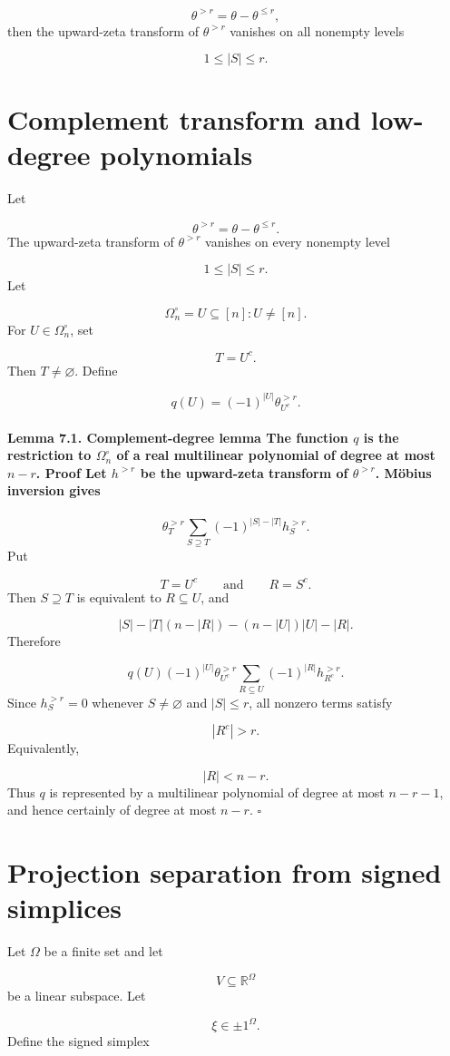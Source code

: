 \documentclass[11pt]{article}
\theoremstyle{definition}
\begin{document}
\[
\theta^{>r}=\theta-\theta^{\le r},
\]
then the upward-zeta transform of $\theta^{>r}$ vanishes on all nonempty levels

\[
1\le |S|\le r.
\]
\section{Complement transform and low-degree polynomials}
Let

\[
\theta^{>r}=\theta-\theta^{\le r}.
\]
The upward-zeta transform of $\theta^{>r}$ vanishes on every nonempty level

\[
1\le |S|\le r.
\]
Let

\[
\Omega_n^\circ={U\subseteq[n]:U\ne[n]}.
\]
For $U\in\Omega_n^\circ$, set

\[
T=U^c.
\]
Then $T\ne\varnothing$. Define

\[
q(U)=(-1)^{|U|}\theta^{>r}_{U^c}.
\]
\paragraph{Lemma 7.1. Complement-degree lemma The function $q$ is the restriction to $\Omega_n^\circ$ of a real multilinear polynomial of degree at most $n-r$. Proof Let $h^{>r}$ be the upward-zeta transform of $\theta^{>r}$. Möbius inversion gives}
\[
\theta_T^{>r}
\sum_{S\supseteq T}
(-1)^{|S|-|T|}h_S^{>r}.
\]
Put

\[
T=U^c
\qquad\text{and}\qquad
R=S^c.
\]
Then $S\supseteq T$ is equivalent to $R\subseteq U$, and

\[
|S|-|T|
(n-|R|)-(n-|U|)
|U|-|R|.
\]
Therefore

\[
q(U)
(-1)^{|U|}\theta^{>r}_{U^c}
\sum_{R\subseteq U}
(-1)^{|R|}h^{>r}_{R^c}.
\]
Since $h_S^{>r}=0$ whenever $S\ne\varnothing$ and $|S|\le r$, all nonzero terms satisfy

\[
|R^c|>r.
\]
Equivalently,

\[
|R|<n-r.
\]
Thus $q$ is represented by a multilinear polynomial of degree at most $n-r-1$, and hence certainly of degree at most $n-r$. $\square$

\section{Projection separation from signed simplices}
Let $\Omega$ be a finite set and let

\[
V\subseteq\mathbb{R}^\Omega
\]
be a linear subspace. Let

\[
\xi\in{\pm1}^{\Omega}.
\]
Define the signed simplex
\end{document}
